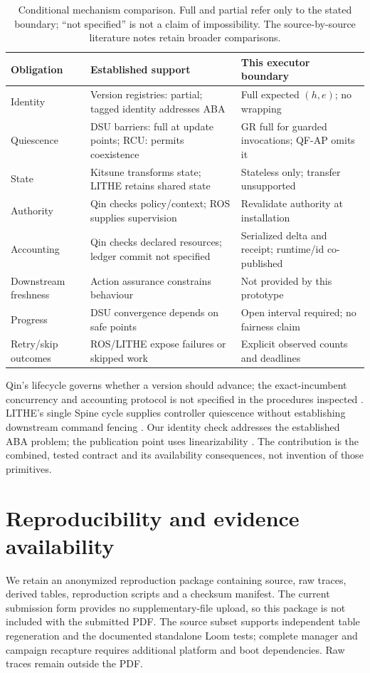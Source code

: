 \begin{table}[!ht]
\caption{Conditional mechanism comparison. Full and partial refer only to the stated boundary; ``not specified'' is not a claim of impossibility. The source-by-source literature notes retain broader comparisons.}
\label{tab:related}
\centering\small
\begin{tabular}{@{}p{.19\linewidth}p{.37\linewidth}p{.36\linewidth}@{}}
\toprule
Obligation & Established support & This executor boundary\\\midrule
Identity & Version registries: partial; tagged identity addresses ABA & Full expected $(h,e)$; no wrapping\\
Quiescence & DSU barriers: full at update points; RCU: permits coexistence & GR full for guarded invocations; QF-AP omits it\\
State & Kitsune transforms state; LITHE retains shared state & Stateless only; transfer unsupported\\
Authority & Qin checks policy/context; ROS supplies supervision & Revalidate authority at installation\\
Accounting & Qin checks declared resources; ledger commit not specified & Serialized delta and receipt; runtime/id co-published\\
Downstream freshness & Action assurance constrains behaviour & Not provided by this prototype\\
Progress & DSU convergence depends on safe points & Open interval required; no fairness claim\\
Retry/skip outcomes & ROS/LITHE expose failures or skipped work & Explicit observed counts and deadlines\\
\bottomrule
\end{tabular}
\end{table}

Qin's lifecycle governs whether a version should advance; the exact-incumbent concurrency and accounting protocol is not specified in the procedures inspected \citep{qin2026governed}. LITHE's single Spine cycle supplies controller quiescence without establishing downstream command fencing \citep{lim2026lithe}. Our identity check addresses the established ABA problem; the publication point uses linearizability \citep{michael2004hazard,herlihy1990linearizability}. The contribution is the combined, tested contract and its availability consequences, not invention of those primitives.

\section{Reproducibility and evidence availability}
\label{app:artifact}
We retain an anonymized reproduction package containing source, raw traces, derived tables, reproduction scripts and a checksum manifest. The current submission form provides no supplementary-file upload, so this package is not included with the submitted PDF. The source subset supports independent table regeneration and the documented standalone Loom tests; complete manager and campaign recapture requires additional platform and boot dependencies. Raw traces remain outside the PDF.
